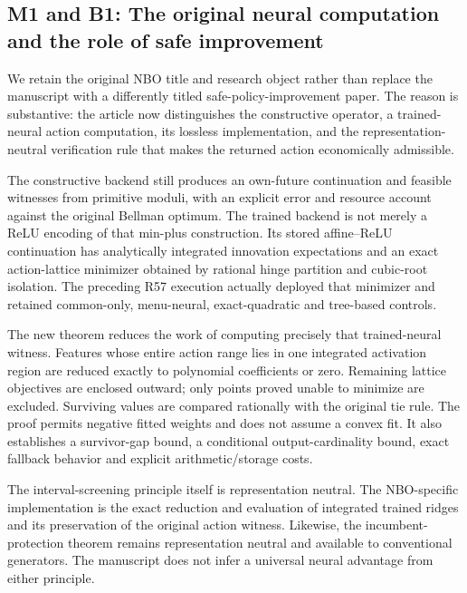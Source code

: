 \hypertarget{m1-and-b1-the-original-neural-computation-and-the-role-of-safe-improvement}{%
\subsection{M1 and B1: The original neural computation and the role of
safe
improvement}\label{m1-and-b1-the-original-neural-computation-and-the-role-of-safe-improvement}}

We retain the original NBO title and research object rather than replace
the manuscript with a differently titled safe-policy-improvement paper.
The reason is substantive: the article now distinguishes the
constructive operator, a trained-neural action computation, its lossless
implementation, and the representation-neutral verification rule that
makes the returned action economically admissible.

The constructive backend still produces an own-future continuation and
feasible witnesses from primitive moduli, with an explicit error and
resource account against the original Bellman optimum. The trained
backend is not merely a ReLU encoding of that min-plus construction. Its
stored affine--ReLU continuation has analytically integrated innovation
expectations and an exact action-lattice minimizer obtained by rational
hinge partition and cubic-root isolation. The preceding R57 execution
actually deployed that minimizer and retained common-only, menu-neural,
exact-quadratic and tree-based controls.

The new theorem reduces the work of computing precisely that
trained-neural witness. Features whose entire action range lies in one
integrated activation region are reduced exactly to polynomial
coefficients or zero. Remaining lattice objectives are enclosed outward;
only points proved unable to minimize are excluded. Surviving values are
compared rationally with the original tie rule. The proof permits
negative fitted weights and does not assume a convex fit. It also
establishes a survivor-gap bound, a conditional output-cardinality
bound, exact fallback behavior and explicit arithmetic/storage costs.

The interval-screening principle itself is representation neutral. The
NBO-specific implementation is the exact reduction and evaluation of
integrated trained ridges and its preservation of the original action
witness. Likewise, the incumbent-protection theorem remains
representation neutral and available to conventional generators. The
manuscript does not infer a universal neural advantage from either
principle.


